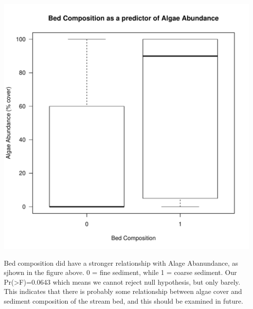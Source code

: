 \documentclass{article}
\begin{document}
\begin{knitrout}
\color{fgcolor}
\includegraphics[width=\maxwidth]{figure/unnamed-chunk-5-1} 

\end{knitrout}
Bed composition did have a stronger relationship with Alage Abanundance, as sjhown in the figure above. 0 = fine sediment, while 1 = coarse sediment. Our Pr(>F)=0.0643 which means we cannot reject null hypothesis, but only barely. This indicates that there is probably some relationship between algae cover and sediment composition of the stream bed, and this should be examined in future.
\end{document}
